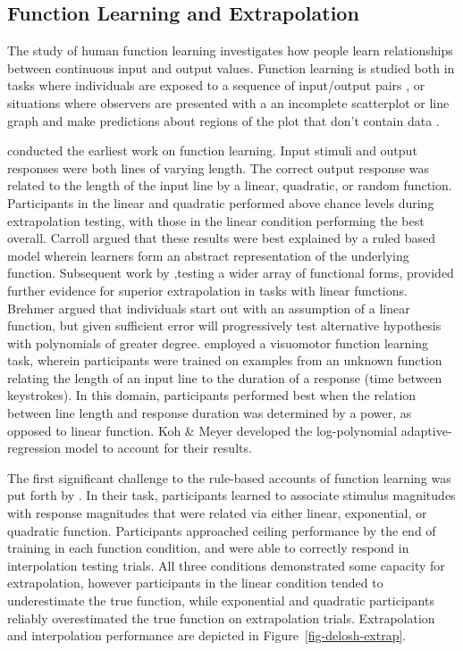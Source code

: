\documentclass[
  12pt,
  letterpaper,
]{article}
\begin{document}
\subsection{Function Learning and
Extrapolation}\label{function-learning-and-extrapolation}

The study of human function learning investigates how people learn
relationships between continuous input and output values. Function
learning is studied both in tasks where individuals are exposed to a
sequence of input/output pairs
\autocite{deloshExtrapolationSineQua1997,mcdanielEffectsSpacedMassed2013},
or situations where observers are presented with a an incomplete
scatterplot or line graph and make predictions about regions of the plot
that don't contain data
\autocite{ciccioneCanHumansPerform2021a,courrieuQuickApproximationBivariate2012,saidExtrapolationAccuracyUnderestimates2021,schulzCommunicatingCompositionalPatterns2020}.

\textcite{carrollFunctionalLearningLearning1963} conducted the earliest
work on function learning. Input stimuli and output responses were both
lines of varying length. The correct output response was related to the
length of the input line by a linear, quadratic, or random function.
Participants in the linear and quadratic performed above chance levels
during extrapolation testing, with those in the linear condition
performing the best overall. Carroll argued that these results were best
explained by a ruled based model wherein learners form an abstract
representation of the underlying function. Subsequent work by
\textcite{brehmerHypothesesRelationsScaled1974},testing a wider array of
functional forms, provided further evidence for superior extrapolation
in tasks with linear functions. Brehmer argued that individuals start
out with an assumption of a linear function, but given sufficient error
will progressively test alternative hypothesis with polynomials of
greater degree. \textcite{kohFunctionLearningInduction1991} employed a
visuomotor function learning task, wherein participants were trained on
examples from an unknown function relating the length of an input line
to the duration of a response (time between keystrokes). In this domain,
participants performed best when the relation between line length and
response duration was determined by a power, as opposed to linear
function. Koh \& Meyer developed the log-polynomial adaptive-regression
model to account for their results.

The first significant challenge to the rule-based accounts of function
learning was put forth by \textcite{deloshExtrapolationSineQua1997} . In
their task, participants learned to associate stimulus magnitudes with
response magnitudes that were related via either linear, exponential, or
quadratic function. Participants approached ceiling performance by the
end of training in each function condition, and were able to correctly
respond in interpolation testing trials. All three conditions
demonstrated some capacity for extrapolation, however participants in
the linear condition tended to underestimate the true function, while
exponential and quadratic participants reliably overestimated the true
function on extrapolation trials. Extrapolation and interpolation
performance are depicted in Figure~\ref{fig-delosh-extrap}.
\end{document}
